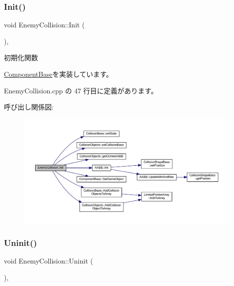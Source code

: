 \subsubsection{\texorpdfstring{Init()}{Init()}}
{\footnotesize\ttfamily void Enemy\+Collision\+::\+Init (\begin{DoxyParamCaption}{ }\end{DoxyParamCaption})\hspace{0.3cm}{\ttfamily [override]}, {\ttfamily [virtual]}}



初期化関数 



\mbox{\hyperlink{class_component_base_a125939d6befe42f28886a6523e86b18b}{Component\+Base}}を実装しています。



 Enemy\+Collision.\+cpp の 47 行目に定義があります。

呼び出し関係図\+:\nopagebreak
\begin{figure}[H]
\begin{center}
\leavevmode
\includegraphics[width=350pt]{class_enemy_collision_ae5c000a30c8c4a023dd0c8e658def772_cgraph}
\end{center}
\end{figure}
\mbox{\label{class_enemy_collision_a2a194c606fd162db803c70c6fed9b9e4}} 
\subsubsection{\texorpdfstring{Uninit()}{Uninit()}}
{\footnotesize\ttfamily void Enemy\+Collision\+::\+Uninit (\begin{DoxyParamCaption}{ }\end{DoxyParamCaption})\hspace{0.3cm}{\ttfamily [override]}, {\ttfamily [virtual]}}



